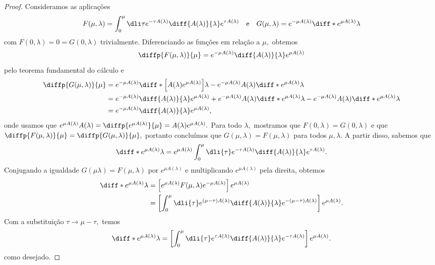 \begin{proof}
   Consideramos as aplicações
   \begin{equation*}
      F(\mu, \lambda) = \int_0^\mu \dli\tau e^{-\tau A(\lambda)} \diff{A(\lambda)}{\lambda} e^{\tau A(\lambda)}
      \quad\text{e}\quad
      G(\mu, \lambda) =  e^{-\mu A(\lambda)}\diff*{e^{\mu A(\lambda)}}{\lambda}
   \end{equation*}
   com \(F(0, \lambda) = 0 = G(0, \lambda)\) trivialmente. Diferenciando as funções em relação a \(\mu,\) obtemos
   \begin{equation*}
      \diffp{F(\mu,\lambda)}{\mu} = e^{-\mu A(\lambda)} \diff{A(\lambda)}{\lambda} e^{\mu A(\lambda)}
   \end{equation*}
   pelo teorema fundamental do cálculo e
   \begin{align*}
      \diffp{G(\mu, \lambda)}{\mu} &= e^{-\mu A(\lambda)} \diff*{\left[A(\lambda) e^{\mu A(\lambda)}\right]}{\lambda}-e^{-\mu A(\lambda)} A(\lambda) \diff*{e^{\mu A(\lambda)}}{\lambda}\\
                                   &= e^{-\mu A(\lambda)} \diff{A(\lambda)}{\lambda} e^{\mu A(\lambda)} + e^{-\mu A(\lambda)} A(\lambda) \diff*{e^{\mu A(\lambda)}}{\lambda} - e^{-\mu A(\lambda)} A(\lambda) \diff*{e^{\mu A(\lambda)}}{\lambda}\\
                                   &= e^{-\mu A(\lambda)} \diff{A(\lambda)}{\lambda} e^{\mu A(\lambda)},
   \end{align*}
   onde usamos que \(e^{\mu A(\lambda)} A(\lambda) = \diffp{e^{\mu A(\lambda)}}{\mu} = A(\lambda) e^{\mu A(\lambda)}.\) Para todo \(\lambda,\) mostramos que \(F(0,\lambda) = G(0, \lambda)\) e que \(\diffp{F(\mu, \lambda)}{\mu} = \diffp{G(\mu, \lambda)}{\mu},\) portanto concluímos que \(G(\mu, \lambda) = F(\mu, \lambda)\) para todos \(\mu, \lambda\). A partir disso, sabemos que
   \begin{equation*}
      \diff*{e^{\mu A(\lambda)}}{\lambda} = e^{\mu A(\lambda)} \int_0^\mu \dli{\tau} e^{-\tau A(\lambda)} \diff{A(\lambda)}{\lambda} e^{\tau A(\lambda)}.
   \end{equation*}
   Conjugando a igualdade \(G(\mu \lambda) = F(\mu, \lambda)\) por \(e^{\mu A(\lambda)}\) e multiplicando \(e^{\mu A(\lambda)}\) pela direita, obtemos
   \begin{align*}
      \diff*{e^{\mu A(\lambda)}}{\lambda} &= \left[e^{\mu A(\lambda)} F(\mu, \lambda) e^{-\mu A(\lambda)}\right]e^{\mu A(\lambda)}\\
                                          &= \left[\int_0^\mu \dli{\tau} e^{(\mu - \tau) A(\lambda)} \diff{A(\lambda)}{\lambda} e^{-(\mu - \tau)A(\lambda)}\right] e^{\mu A(\lambda)}.
   \end{align*}
   Com a substituição \(\tau \to \mu - \tau,\) temos
   \begin{equation*}
      \diff*{e^{\mu A(\lambda)}}{\lambda} = \left[\int_0^\mu \dli{\tau} e^{\tau A(\lambda)} \diff{A(\lambda)}{\lambda} e^{-\tau A(\lambda)}\right] e^{\mu A(\lambda)}.
   \end{equation*}
   como desejado.
\end{proof}

